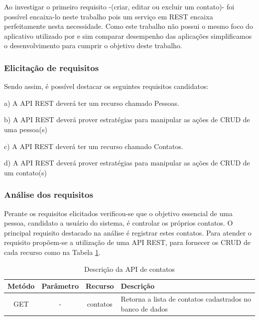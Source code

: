   Ao investigar o primeiro requisito -(criar, editar ou excluir um contato)- foi possível encaixa-lo neste trabalho pois um serviço em
  REST encaixa perfeitamente nesta necessidade. Como este trabalho não possui o mesmo foco do aplicativo utilizado por 
  e sim comparar desempenho das aplicações simplificamos o desenvolvimento para cumprir o objetivo deste trabalho.

\subsubsection{Elicitação de requisitos}

  Sendo assim, é possível destacar os seguintes requisitos candidatos:

  \begin{compactitem}
    \item[a)] A \ac{API} \ac{REST} deverá ter um recurso chamado Pessoas.
    \item[b)] A \ac{API} \ac{REST} deverá prover estratégias para manipular as ações de CRUD de uma pessoa(s)
    \item[c)] A \ac{API} \ac{REST} deverá ter um recurso chamado Contatos.
    \item[d)] A \ac{API} \ac{REST} deverá prover estratégias para manipular as ações de CRUD de um contato(s)
  \end{compactitem}
  
\subsubsection{Análise dos requisitos}
  
  Perante os requisitos elicitados verificou-se que o objetivo essencial de uma pessoa, candidato a usuário
  do sistema, é controlar os próprios contatos.
  O principal requisito destacado na análise é registrar estes contatos. Para atender o requisito
  propõem-se a utilização de uma \ac{API} \ac{REST}, para fornecer os \ac{CRUD} de cada recurso
  como na Tabela \ref{tab:api-descricao-contato}.
 
  
  \begin{table}[H]
    \centering
    \footnotesize
    \vspace{0.5cm}
    \setlength{\abovecaptionskip}{0pt}
    \setlength{\belowcaptionskip}{0pt}
    \caption[Descrição da API de contatos]{Descrição da API de contatos}
    \label{tab:api-descricao-contato}
    \begin{tabular}{c|c|c|p{8cm}}
      \hline \hline
      Metódo  &	Parâmetro &	Recurso &	Descrição \\
      \hline \hline
      GET	& -	& contatos	& Retorna a lista de contatos 
					  cadastrados no banco de dados \\
      \hline \hline
    \end{tabular}
  \end{table}
  
